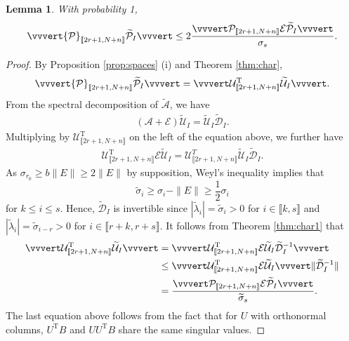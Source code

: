 \documentclass[reqno]{amsart}
\newcommand{\T}{\mathrm{T}}
\theoremstyle{plain}
\newtheorem{lemma}[theorem]{Lemma}
\theoremstyle{definition}
\begin{document}
\begin{lemma}With probability 1, 
\begin{equation}\label{eq:nullbd}
 \vvvert {\mathcal P}_{\llbracket 2r+1, N+n\rrbracket}  \widetilde{\mathcal P}_I \vvvert \le 2\frac{\vvvert  \mathcal P_{\llbracket 2r+1, N+n\rrbracket} \mathcal E \widetilde{\mathcal P}_I \vvvert}{\sigma_{s}}.
\end{equation}
\end{lemma}
\begin{proof}By Proposition  \ref{prop:spaces} (i) and Theorem \ref{thm:char},
$$ \vvvert {\mathcal P}_{\llbracket 2r+1, N+n\rrbracket}  \widetilde{\mathcal P}_I \vvvert = \vvvert \mathcal U_{\llbracket 2r+1, N+n\rrbracket}^\T  \widetilde{\mathcal U}_I \vvvert.$$
From the spectral decomposition of $\widetilde{\mathcal A}$, we have
\begin{align*}
(\mathcal A + \mathcal E) \widetilde{\mathcal U}_I = \widetilde{\mathcal U}_I \widetilde{\mathcal D}_I.
\end{align*}
Multiplying by $\mathcal U_{\llbracket 2r+1, N+n\rrbracket}^\T$ on the left of the equation above, we further have
\begin{align}\label{eq:061125}
\mathcal U_{\llbracket 2r+1, N+n\rrbracket}^\T \mathcal E \widetilde{\mathcal U}_{I} = \mathcal U_{\llbracket 2r+1, N+n\rrbracket}^T  \widetilde{\mathcal U}_I \widetilde{\mathcal D}_I.
\end{align}
As $\sigma_{r_0} \ge b\|E\| \ge 2 \| E \|$ by supposition, Weyl's inequality %
implies that 
\begin{equation} \label{eq:hatlambdabnd}
	\widetilde{\sigma}_{i} \geq \sigma_{i} - \|E \| \geq \frac{1}{2} \sigma_{i} 
\end{equation}  
for $k\le i \le s$. 
Hence, $\widetilde{\mathcal D}_I$ is invertible since $|\widetilde\lambda_i| =\widetilde \sigma_i >0$ for  $i\in \llbracket k, s\rrbracket$ and $|\widetilde\lambda_i| = \widetilde \sigma_{i-r}>0$ for  $i\in \llbracket r+k, r+s\rrbracket$. It follows from Theorem \ref{thm:char1} that 
\begin{align*}
\vvvert \mathcal U_{\llbracket 2r+1, N+n\rrbracket}^\T  \widetilde{\mathcal U}_I \vvvert &= \vvvert \mathcal U_{\llbracket 2r+1, N+n\rrbracket}^\T \mathcal E \widetilde{\mathcal U}_I \widetilde{\mathcal D}_I^{-1}\vvvert\\
 &\le \vvvert \mathcal U_{\llbracket 2r+1, N+n\rrbracket}^\T \mathcal E \widetilde{\mathcal U}_I\vvvert  \|\widetilde{\mathcal D}_I^{-1}\| \\
&= \frac{\vvvert \mathcal P_{\llbracket 2r+1, N+n\rrbracket} \mathcal E \widetilde{\mathcal P}_I \vvvert}{\widetilde{\sigma}_{s}}.
\end{align*}
The last equation above follows from the fact that for $U$ with orthonormal columns, $U^\T B$ and $UU^\T B$ share the same singular values. 


\end{proof}
\end{document}
